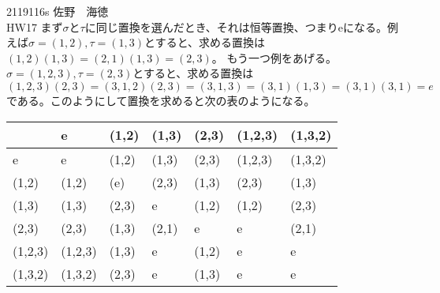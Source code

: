 \documentclass[11pt]{jsarticle}
\begin{document}
    2119116s 佐野　海徳\\
HW17 まず$\sigma$と$\tau$に同じ置換を選んだとき、それは恒等置換、つまりeになる。例えば$\sigma = (1,2),\tau = (1,3)$とすると、求める置換は$(1,2)(1,3) = (2,1)(1,3) = (2,3)$。
もう一つ例をあげる。$\sigma = (1,2,3),\tau = (2,3)$とすると、求める置換は$(1,2,3)(2,3) = (3,1,2)(2,3) = (3,1,3) = (3,1)(1,3) = (3,1)(3,1) = e$である。このようにして置換を求めると次の表のようになる。\\
\begin{table}[h]
\begin{tabular}{|l||l|l|l|l|l|l|}
　     & e & (1,2) & (1,3) & (2,3) & (1,2,3) & (1,3,2) \\ \hline \hline
e      & e & (1,2) & (1,3) & (2,3) & (1,2,3) & (1,3,2) \\
(1,2) & (1,2) & (e) & (2,3) & (1,3) & (2,3) & (1,3) \\
(1,3) & (1,3) & (2,3) & e & (1,2) & (1,2) & (2,3) \\
(2,3) & (2,3) & (1,3) & (2,1) & e & e & (2,1) \\
(1,2,3) & (1,2,3) & (1,3) & e & (1,2) & e & e \\
(1,3,2) & (1,3,2) & (2,3) & e & (1,3) & e & e \\
\end{tabular}
\end{table}
\end{document}

